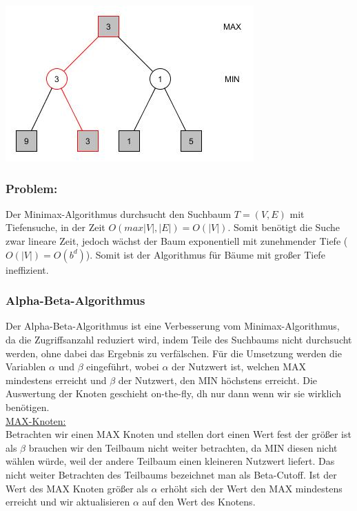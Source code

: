 \begin{center}
	\includegraphics[width = 7 cm]{chapters/minimax/jpg/Graph-Minmax4.jpg}
\end{center}

\vskip 60pt



\subsubsection*{Problem:} Der Minimax-Algorithmus durchsucht den Suchbaum $T=(V, E)$ mit Tiefensuche, in der Zeit $O(max {|V|, |E|}) = O(|V|)$. Somit benötigt die Suche zwar lineare Zeit, jedoch wächst der Baum exponentiell mit zunehmender Tiefe ($O(|V|)=O(b^d)$). Somit ist der Algorithmus für Bäume mit großer Tiefe ineffizient.


\subsubsection*{Alpha-Beta-Algorithmus}
 Der Alpha-Beta-Algorithmus ist eine Verbesserung vom Minimax-Algorithmus, da die Zugriffsanzahl reduziert wird, indem Teile des Suchbaums nicht durchsucht werden, ohne dabei das Ergebnis zu verfälschen. Für die Umsetzung werden die Variablen $\alpha$ und $\beta$ eingeführt, wobei $\alpha$ der Nutzwert ist, welchen MAX mindestens erreicht und $\beta$ der Nutzwert, den MIN höchstens erreicht. Die Auswertung der Knoten geschieht on-the-fly, dh nur dann wenn wir sie wirklich benötigen. \\

 \underline{MAX-Knoten:}\\
 Betrachten wir einen MAX Knoten und stellen dort einen Wert fest der größer ist als $\beta$ brauchen wir den Teilbaum nicht weiter betrachten, da MIN diesen nicht wählen würde, weil der andere Teilbaum einen kleineren Nutzwert liefert. Das nicht weiter Betrachten des Teilbaums bezeichnet man als Beta-Cutoff. Ist  der Wert des MAX Knoten größer als $\alpha$ erhöht sich der Wert den MAX mindestens erreicht und wir aktualisieren $\alpha$ auf den Wert des Knotens.  \\

